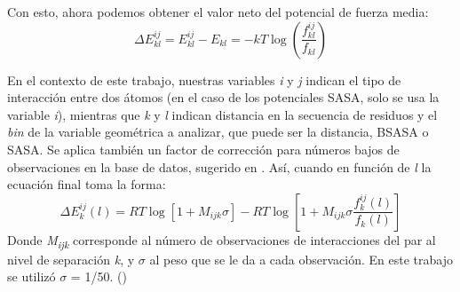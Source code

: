Con esto, ahora podemos obtener el valor neto del potencial de fuerza media:
\begin{equation}
\Delta E^{ij}_{kl} = E^{ij}_{kl} - E_{kl} = -kT\log \left( \frac{f^{ij}_{kl}}{f_{kl}} \right) \label{ec:boltzref2}
\end{equation}
\par
En el contexto de este trabajo, nuestras variables \textit{i} y \textit{j} indican el tipo de interacción entre dos átomos (en el caso de los potenciales SASA, solo se usa la variable \textit{i}), mientras que \textit{k} y \textit{l} indican distancia en la secuencia de residuos y el \textit{bin} de la variable geométrica a analizar, que puede ser la distancia, BSASA o SASA.
Se aplica también un factor de corrección para números bajos de observaciones en la base de datos, sugerido en \cite{Sippl1990}. 
Así, cuando en función de \textit{l} la ecuación final toma la forma:
\begin{equation}
\Delta E^{ij}_{k}(l) = RT\log \left[1 + M_{ijk}\sigma\right] - RT\log \left[ 1 + M_{ijk}\sigma \frac{f^{ij}_{k}(l)}{f_{k}(l)} \right] \label{ec:finalboltz}
\end{equation}
Donde \textit{M\textsubscript{ijk}} corresponde al número de observaciones de interacciones del par al nivel de separación \textit{k}, y $\sigma$ al peso que se le da a cada observación. 
En este trabajo se utilizó $\sigma$ = 1/50. (\cite{Sippl1990,Melo1997})


